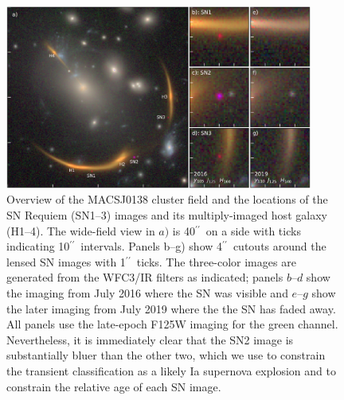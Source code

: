 \documentclass[12pt,dvipsnames]{article}
\gdef\arcsec{$^{\prime\prime}$}
\begin{document}

\clearpage
\begin{figure}
    \centering
    \includegraphics[draft=False,width=0.9\textwidth]{Paper/Figures/fig1_layout.pdf}
    \caption{Overview of the MACSJ0138 cluster field and the locations of the SN Requiem (SN1--3) images and its multiply-imaged host galaxy (H1--4). The wide-field view in $a)$ is 40\arcsec\ on a side with ticks indicating 10\arcsec\ intervals.  Panels b--g) show 4\arcsec\ cutouts around the lensed SN images with 1\arcsec\ ticks.  The three-color images are generated from the WFC3/IR filters as indicated; panels $b$--$d$ show the imaging from July 2016 where the SN was visible and $e$--$g$ show the later imaging from July 2019 where the the SN has faded away.  All panels use the late-epoch F125W imaging for the green channel.  Nevertheless, it is immediately clear that the SN2 image is substantially bluer than the other two, which we use to constrain the transient classification as a likely Ia supernova explosion and to constrain the relative age of each SN image.}
    
    \label{fig:layout}
\end{figure}
\clearpage
\end{document}
